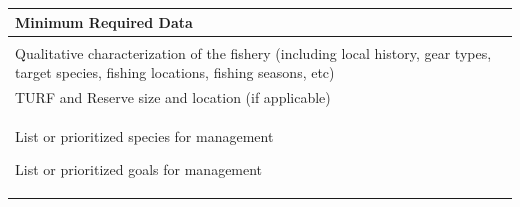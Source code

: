 \documentclass[]{book}
\begin{document}
\begin{longtable}[]{@{}l@{}}
\toprule
\begin{minipage}[b]{0.48\columnwidth}\raggedright\strut
\textbf{Minimum Required Data}\strut
\end{minipage}\tabularnewline
\midrule
\endhead
\begin{minipage}[t]{0.48\columnwidth}\raggedright\strut
\strut
\end{minipage}\tabularnewline
\begin{minipage}[t]{0.48\columnwidth}\raggedright\strut
Qualitative characterization of the fishery (including local history,
gear types, target species, fishing locations, fishing seasons,
etc)\strut
\end{minipage}\tabularnewline
\begin{minipage}[t]{0.48\columnwidth}\raggedright\strut
TURF and Reserve size and location (if applicable)\strut
\end{minipage}\tabularnewline
\begin{minipage}[t]{0.97\columnwidth}\raggedright\strut
List or prioritized species for management

List or prioritized goals for management


\end{minipage}
\end{longtable}
\end{document}
